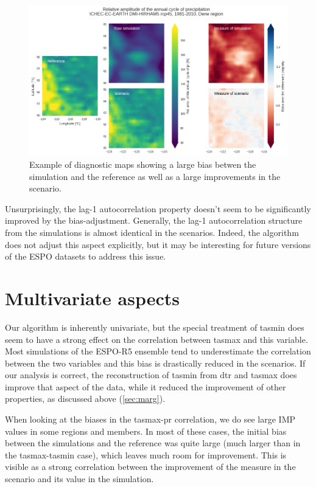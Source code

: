 \documentclass[letterpaper,10pt]{article}
\begin{document}
\begin{figure}
\includegraphics[width=\textwidth]{../images/aca_pr_diags.png}
\caption{Example of diagnostic maps showing a large bias betwen the simulation and the reference as well as a large improvements in the scenario.}\label{fig:acapr}
\end{figure}


Unsurprisingly, the lag-1 autocorrelation property doesn't seem to be significantly improved by the bias-adjustment. Generally, the lag-1 autocorrelation structure from the simulations is almost identical in the scenarios. Indeed, the algorithm does not adjust this aspect explicitly, but it may be interesting for future versions of the ESPO datasets to address this issue.

\section{Multivariate aspects}
Our algorithm is inherently univariate, but the special treatment of tasmin does seem to have a strong effect on the correlation between tasmax and this variable. Most simulations of the ESPO-R5 ensemble tend to underestimate the correlation between the two variables and this bias is drastically reduced in the scenarios. If our analysis is correct, the reconstruction of tasmin from dtr and tasmax does improve that aspect of the data, while it reduced the improvement of other properties, as discussed above (\ref{sec:marg}).

When looking at the biases in the tasmax-pr correlation, we do see large IMP values in some regions and members. In most of these cases, the initial bias between the simulations and the reference was quite large (much larger than in the tasmax-tasmin case), which leaves much room for improvement. This is visible as a strong correlation between the improvement of the measure in the scenario and its value in the simulation.
\end{document}
